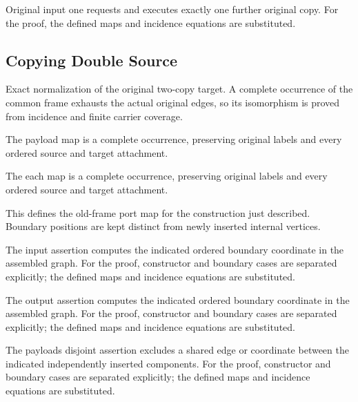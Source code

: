 Original input one requests and executes exactly one further original copy.
For the proof, the defined maps and incidence equations are substituted.
\par{}

\subsection{Copying Double Source}
Exact normalization of the original two-copy target. A complete occurrence of the common frame exhausts the actual original edges, so its isomorphism is proved from incidence and finite carrier coverage.

The payload map is a complete occurrence, preserving original labels and every ordered source and target attachment.
\par{}

The each map is a complete occurrence, preserving original labels and every ordered source and target attachment.
\par{}

This defines the old-frame port map for the construction just described. Boundary positions are kept distinct from newly inserted internal vertices.
\par{}

The input assertion computes the indicated ordered boundary coordinate in the assembled graph.
For the proof, constructor and boundary cases are separated explicitly; the defined maps and incidence equations are substituted.
\par{}

The output assertion computes the indicated ordered boundary coordinate in the assembled graph.
For the proof, constructor and boundary cases are separated explicitly; the defined maps and incidence equations are substituted.
\par{}

The payloads disjoint assertion excludes a shared edge or coordinate between the indicated independently inserted components.
For the proof, constructor and boundary cases are separated explicitly; the defined maps and incidence equations are substituted.
\par{}

